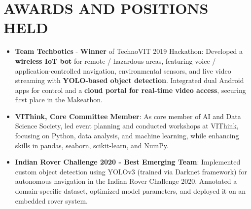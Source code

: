\documentclass[letterpaper,11pt]{article}
\newcommand{\resumeItem}[1]{
  \item\small{
    {#1 \vspace{-2pt}}
  }
}
\newcommand{\resumeSubItem}[2]{\resumeItem{#1: #2}\vspace{-4pt}}
\newcommand{\resumeSubHeadingListStart}{\begin{itemize}[leftmargin=*]}
\newcommand{\resumeSubHeadingListEnd}{\end{itemize}}
\begin{document}

\section{AWARDS AND POSITIONS HELD}
  \resumeSubHeadingListStart
    \resumeSubItem{\textbf{Team Techbotics} - \textbf{Winner} of TechnoVIT 2019 Hackathon}{Developed a \textbf{wireless IoT bot} for remote / hazardous areas, featuring voice / application-controlled navigation, environmental sensors, and live video streaming with \textbf{YOLO-based object detection}. Integrated dual Android apps for control and a \textbf{cloud portal for real-time video access}, securing first place in the Makeathon.}
    \\[1em]
     \resumeSubItem{\textbf{VIThink, Core Committee Member}}{As core member of AI and Data Science Society, led event planning and conducted workshops at VIThink, focusing on Python, data analysis, and machine learning, while enhancing skills in pandas, seaborn, scikit-learn, and NumPy.} 
     \\[1em]
    \resumeSubItem{\textbf{Indian Rover Challenge 2020 - Best Emerging Team}}{Implemented custom object detection using YOLOv3 (trained via Darknet framework) for autonomous navigation in the Indian Rover Challenge 2020. Annotated a domain-specific dataset, optimized model parameters, and deployed it on an embedded rover system.}
  \resumeSubHeadingListEnd
\end{document}
